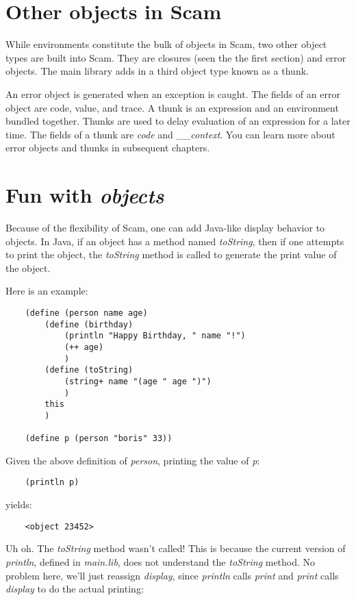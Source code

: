 \section{Other objects in Scam}

While environments constitute the bulk of objects in
Scam, two other object types are built into Scam. They are closures
(seen the the first section) and error objects. The
main library adds in a third object type known as a thunk.

An error object is generated when an exception is caught.
The fields of an error object are code, value, and trace.
A thunk is an expression and an environment bundled
together. Thunks are used to delay evaluation of
an expression for a later time. The fields of a thunk
are {\it code} and {\it \_\_context}.
You can learn more about error objects and thunks
in subsequent chapters.

\section{Fun with {\it objects}}

Because of the flexibility of Scam, one can
add Java-like display behavior to objects.
In Java, if an object has a method named {\it toString},
then if one attempts to print the object, the {\it toString}
method is called to generate the print value of the object.

Here is an example:

\begin{verbatim}
    (define (person name age)
        (define (birthday)
            (println "Happy Birthday, " name "!")
            (++ age)
            )
        (define (toString)
            (string+ name "(age " age ")")
            )
        this
        )

    (define p (person "boris" 33))
\end{verbatim}

Given the above definition of {\it person}, printing the value of {\it p}:

\begin{verbatim}
    (println p)
\end{verbatim}

yields:

\begin{verbatim}
    <object 23452>
\end{verbatim}

Uh oh. The {\it toString} method wasn't called! This is because
the current version of {\it println}, defined in {\it main.lib},
does not understand the {\it toString}
method. No problem here, we'll just reassign {\it display},
since {\it println} calls {\it print} and {\it print} calls {\it display}
to do the actual printing:

